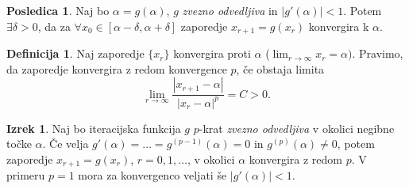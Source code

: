 \documentclass[11pt]{article}
\theoremstyle{definition}
\newtheorem{definicija}{Definicija}[section]
\newtheorem{izrek}{Izrek}
\newtheorem*{posledica}{Posledica}
\begin{document}
\begin{posledica}

Naj bo $\alpha = g(\alpha)$, $g$ \textit{zvezno odvedljiva} in $|g'(\alpha)| < 1$. Potem $\exists \delta > 0$, da za $\forall x_0 \in [\alpha - \delta, \alpha + \delta]$ zaporedje $x_{r+1} = g(x_r)$ konvergira k $\alpha$.

\end{posledica}
\vspace{0.5cm}

\begin{definicija}

Naj zaporedje $\{ x_r \}$ konvergira proti $\alpha$ ($\lim_{r \rightarrow \infty} x_r = \alpha)$. Pravimo, da zaporedje konvergira z redom konvergence $p$, če obstaja limita
$$\lim_{r \rightarrow \infty} \frac{|x_{r+1} - \alpha|}{|x_r - \alpha|^p} = C > 0.$$

\end{definicija}
\vspace{0.5cm}

\begin{izrek}

Naj bo iteracijska funkcija $g$ $p$-krat \textit{zvezno odvedljiva} v okolici negibne točke $\alpha$. Če velja $g'(\alpha) = \ldots = g^{(p-1)}(\alpha) = 0$ in $g^{(p)}(\alpha) \neq 0$, potem zaporedje $x_{r+1} = g(x_r)$, $r = 0, 1, \ldots$, v okolici $\alpha$ konvergira z redom $p$. V primeru $p = 1$ mora za konvergenco veljati še $|g'(\alpha)| < 1$. 

\end{izrek}
\vspace{0.5cm}


\pagebreak

\end{document}
